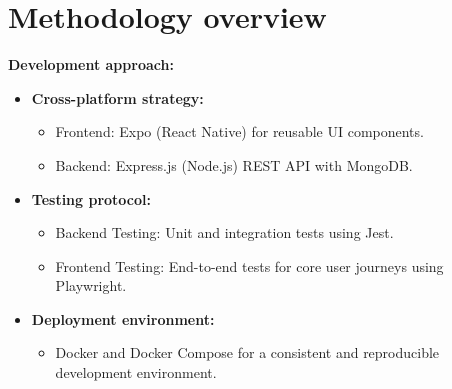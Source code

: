 \section{Methodology overview}
\textbf{Development approach:}
\begin{itemize}
    \item \textbf{Cross-platform strategy:}
    \begin{itemize}
        \item Frontend: Expo (React Native) for reusable UI components.
        \item Backend: Express.js (Node.js) REST API with MongoDB.
    \end{itemize}
    \item \textbf{Testing protocol:}
    \begin{itemize}
        \item Backend Testing: Unit and integration tests using Jest.
        \item Frontend Testing: End-to-end tests for core user journeys using Playwright.
    \end{itemize}
    \item \textbf{Deployment environment:}
    \begin{itemize}
        \item Docker and Docker Compose for a consistent and reproducible development environment.
    \end{itemize}
\end{itemize}
